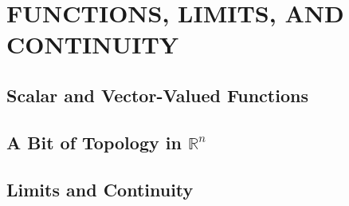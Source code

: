 \section{FUNCTIONS, LIMITS, AND CONTINUITY}

\subsection{Scalar and Vector-Valued Functions}

\subsection{A Bit of Topology in \( \mathbb{R}^n \)}

\subsection{Limits and Continuity}